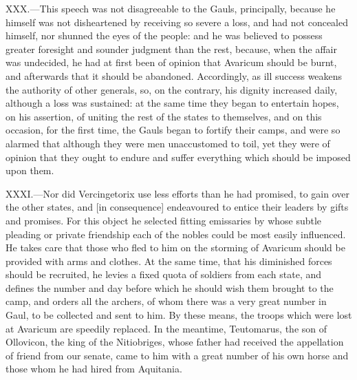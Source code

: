 XXX.—This speech was not disagreeable to the Gauls, principally,
because he himself was not disheartened by receiving so severe a loss,
and had not concealed himself, nor shunned the eyes of the people: and
he was believed to possess greater foresight and sounder judgment than
the rest, because, when the affair was undecided, he had at first been
of opinion that Avaricum should be burnt, and afterwards that it should
be abandoned. Accordingly, as ill success weakens the authority of other
generals, so, on the contrary, his dignity increased daily, although a
loss was sustained: at the same time they began to entertain hopes, on
his assertion, of uniting the rest of the states to themselves, and on
this occasion, for the first time, the Gauls began to fortify their
camps, and were so alarmed that although they were men unaccustomed to
toil, yet they were of opinion that they ought to endure and suffer
everything which should be imposed upon them.

XXXI.—Nor did Vercingetorix use less efforts than he had promised, to
gain over the other states, and [in consequence] endeavoured to entice
their leaders by gifts and promises. For this object he selected fitting
emissaries by whose subtle pleading or private friendship each of the
nobles could be most easily influenced. He takes care that those who
fled to him on the storming of Avaricum should be provided with arms and
clothes. At the same time, that his diminished forces should be
recruited, he levies a fixed quota of soldiers from each state, and
defines the number and day before which he should wish them brought to
the camp, and orders all the archers, of whom there was a very great
number in Gaul, to be collected and sent to him. By these means, the
troops which were lost at Avaricum are speedily replaced. In the
meantime, Teutomarus, the son of Ollovicon, the king of the Nitiobriges,
whose father had received the appellation of friend from our senate,
came to him with a great number of his own horse and those whom he had
hired from Aquitania.

